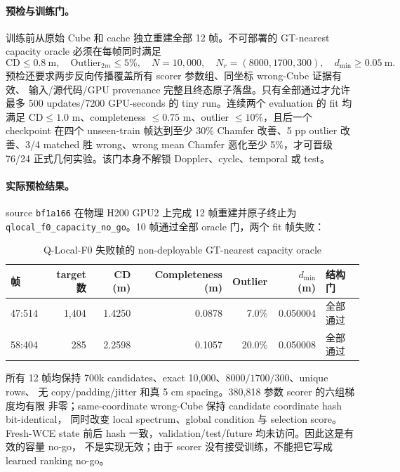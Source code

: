 \documentclass[11pt,a4paper,fontset=none]{ctexart}
\newcommand{\code}[1]{\texttt{#1}}
\begin{document}
\paragraph{预检与训练门。}
训练前从原始 Cube 和 cache 独立重建全部 12 帧。不可部署的 GT-nearest
capacity oracle 必须在每帧同时满足
\begin{equation}
  \mathrm{CD}\le0.8\ \mathrm m,\quad
  \mathrm{Outlier}_{2m}\le5\%,\quad
  N=10{,}000,\quad N_r=(8000,1700,300),\quad d_{\min}\ge0.05\ \mathrm m.
\end{equation}
预检还要求两步反向传播覆盖所有 scorer 参数组、同坐标 wrong-Cube 证据有效、
输入/源代码/GPU provenance 完整且终态原子落盘。只有全部通过才允许最多 500
updates/7200 GPU-seconds 的 tiny run。连续两个 evaluation 的 fit 均满足
$\mathrm{CD}\le1.0$ m、completeness $\le0.75$ m、outlier $\le10\%$，且后一个
checkpoint 在四个 unseen-train 帧达到至少 30\% Chamfer 改善、5 pp outlier
改善、3/4 matched 胜 wrong、wrong mean Chamfer 恶化至少 5\%，才可晋级 76/24
正式几何实验。该门本身不解锁 Doppler、cycle、temporal 或 test。

\paragraph{实际预检结果。}
source \code{bf1a166} 在物理 H200 GPU2 上完成 12 帧重建并原子终止为
\code{qlocal\_f0\_capacity\_no\_go}。10 帧通过全部 oracle 门，两个 fit 帧失败：
\begin{table}[H]
\centering
\small
\caption{Q-Local-F0 失败帧的 non-deployable GT-nearest capacity oracle}
\begin{tabular}{lrrrrrl}
\toprule
帧 & target 数 & CD (m) & Completeness (m) & Outlier & $d_{\min}$ (m) & 结构门 \\
\midrule
47:514 & 1,404 & 1.4250 & 0.0878 & 7.0\% & 0.050004 & 全部通过 \\
58:404 & 285 & 2.2598 & 0.1057 & 20.0\% & 0.050008 & 全部通过 \\
\bottomrule
\end{tabular}
\end{table}
所有 12 帧均保持 700k candidates、exact 10,000、$8000/1700/300$、unique rows、
无 copy/padding/jitter 和真 5 cm spacing。380,818 参数 scorer 的六组梯度均有限
非零；same-coordinate wrong-Cube 保持 candidate coordinate hash bit-identical，
同时改变 local spectrum、global condition 与 selection score。Fresh-WCE state
前后 hash 一致，validation/test/future 均未访问。因此这是有效的容量 no-go，
不是实现无效；由于 scorer 没有接受训练，不能把它写成 learned ranking no-go。
\end{document}
